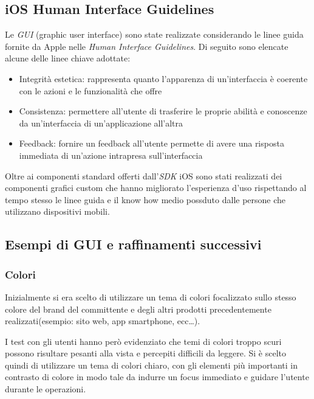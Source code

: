 \subsection{iOS Human Interface Guidelines}

Le \emph{GUI} (graphic user interface) sono state realizzate considerando le linee guida fornite da Apple nelle \emph{Human Interface Guidelines}. Di seguito sono elencate alcune delle linee chiave adottate:

\begin{itemize}
 \item Integrità estetica: rappresenta quanto l'apparenza di un'interfaccia è coerente con le azioni e le funzionalità che offre
 \item Consistenza: permettere all'utente di trasferire le proprie abilità e conoscenze da un'interfaccia di un'applicazione all'altra 
 \item Feedback: fornire un feedback all'utente permette di avere una risposta immediata di un'azione intrapresa sull'interfaccia 
\end{itemize}

Oltre ai componenti standard offerti dall'\emph{SDK} iOS sono stati realizzati dei componenti grafici custom che hanno migliorato l'esperienza d'uso rispettando al tempo stesso le linee guida e il know how medio possduto dalle persone che utilizzano dispositivi mobili.  

\subsection{Esempi di GUI e raffinamenti successivi}

\subsubsection{Colori}
Inizialmente si era scelto di utilizzare un tema di colori focalizzato sullo stesso colore del brand del committente e degli altri prodotti precedentemente realizzati(esempio: sito web, app smartphone, ecc\dots).

I test con gli utenti hanno però evidenziato che temi di colori troppo scuri possono risultare pesanti alla vista e percepiti difficili da leggere. Si è scelto quindi di utilizzare un tema di colori chiaro, con gli elementi più importanti in contrasto di colore in modo tale da indurre un focus immediato e guidare l'utente durante le operazioni.

